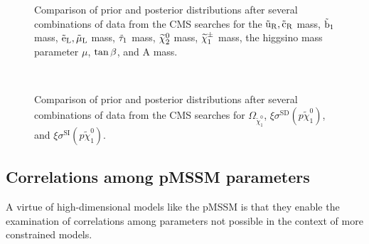 \begin{figure}[p]
\centering
{}\\
\\
\vspace{1mm}
\caption{Comparison of prior and posterior distributions after several combinations of data from the CMS searches for the
$\suR,\scR$ mass, $\sb_{1}$ mass, $\seL,\smuL$ mass, $\stauOne$ mass, $\chitz$ mass, $\chipm$ mass, the higgsino mass parameter $\mu$, $\tanb$, and A mass.}
\label{fig:more1D}
\end{figure}

\begin{figure}[htbp]
  \centering
  \\
        \vspace{1mm}
    \caption{Comparison of prior and posterior distributions after several
  combinations of data from the CMS searches for $\Omega_{\tilde{\chi}^{0}_{1}}$, $\xi\sigma^{\text{SD}}(p\tilde{\chi}_{1}^{0})$, and $\xi\sigma^{\text{SI}}(p\tilde{\chi}_{1}^{0})$.}
    \label{fig:more1D_dm}
\end{figure}
\FloatBarrier

\subsection{Correlations among pMSSM parameters}
A virtue of high-dimensional models like the pMSSM is that they
enable the examination of correlations among parameters not 
possible in the context of more constrained models.

